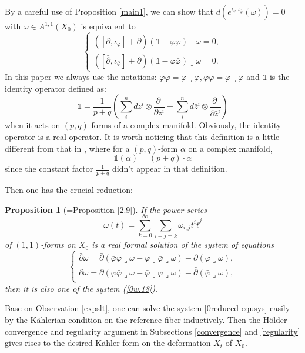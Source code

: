 \documentclass[12pt]{amsart}
\numberwithin{equation}{section}
\newtheorem{proposition}[theorem]{Proposition}
\renewcommand{\1}{\mathds{1}}
\newcommand{\lc}{\lrcorner}
\renewcommand{\>}{\rightarrow}
\newcommand{\p}{\partial}
\def\p{\partial}
\def\b{\bar}
\def\l{\lrcorner}
\begin{document}
By a careful use of Proposition \ref{main1}, we can show that
$d(e^{\iota_{\varphi}|\iota_{\b{\varphi}}}(\omega))=0$ with $\omega\in A^{1,1}(X_0)$ is equivalent
to
 \begin{equation}\label{0w.18}
    \begin{cases}
      ([\p,\iota_{\varphi}]+\b{\p})(\1-\b{\varphi}\varphi)\lc\omega=0,\\
      ([\b{\p},\iota_{\b{\varphi}}]+\p)(\1-\varphi\b{\varphi})\lc\omega=0.
    \end{cases}
 \end{equation}
In this paper we always use the notations: $\varphi
\overline{\varphi} = \overline{\varphi} \lc \varphi,
\overline{\varphi} \varphi = \varphi \lc \overline{\varphi}$ and
$\1$ is the identity operator defined as:
$$\1=\frac{1}{p+q}\left(\sum_i^n dz^i\otimes \frac{\p\ }{\p z^i}+\sum_i^n d\bar z^i\otimes \frac{\p\ }{\p \bar z^i}\right)$$
when it acts on $(p,q)$-forms of a complex manifold. Obviously, the
identity operator is a real operator. It is worth noticing that this
definition is a little different from that in \cite{RZ15}, where for
a $(p,q)$-form $\alpha$ on a complex manifold,
$$\1(\alpha)= (p+q)\cdot\alpha$$
since the constant factor $\frac{1}{p+q}$ didn't appear in that
definition.

Then one has the crucial reduction:
\begin{proposition}[=Proposition \ref{2.9}]\label{02.9}
 If the power series
  $$\omega(t)=\sum_{k=0}^{\infty}\sum_{i+j=k}\omega_{i,j}t^i\b{t}^j$$ of $(1,1)$-forms on $X_0$ is
a real formal solution of the system of equations
\begin{equation}\label{0reduced-equsys}
    \begin{cases}
      \b{\p}\omega=\b{\p}(\b{\varphi}\varphi\l\omega-\varphi\l\b{\varphi}\l\omega)-\p(\varphi\l\omega),\\
      \p\omega=\p(\varphi\b{\varphi}\l\omega-\b{\varphi}\l\varphi\l\omega)-\b{\p}(\b{\varphi}\l\omega),\\
    \end{cases}
\end{equation}
then it is also one of the system (\ref{0w.18}).
\end{proposition}
Base on Observation \ref{expslt}, one can solve the system
\eqref{0reduced-equsys} easily by the K\"ahlerian condition on the
reference fiber inductively. Then the  H\"older convergence and regularity
argument in Subsections \ref{convergence} and \ref{regularity} gives
rises to the desired K\"ahler form on the deformation $X_t$ of
$X_0$.
\end{document}
